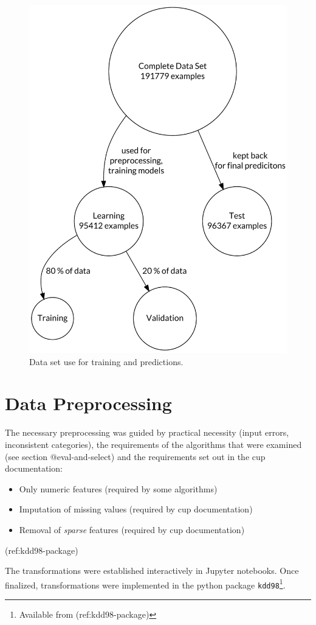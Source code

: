 \documentclass[
  11pt,
  a4paper,
  DIV=12,captions=tableheading,oneside,titlepage=firstiscover,abstracton]{scrreprt}
\providecommand{\tightlist}{%
  \setlength{\itemsep}{0pt}\setlength{\parskip}{0pt}}
\providecommand{\tightlist}{%
  \setlength{\itemsep}{0pt}\setlength{\parskip}{0pt}}
\begin{document}
\begin{figure}

{\centering \includegraphics[width=0.5\linewidth]{figures/preprocessing/data-splitting} 

}

\caption{Data set use for training and predictions.}\label{fig:data-splitting}
\end{figure}

\hypertarget{data-preprocessing}{%
\section{Data Preprocessing}\label{data-preprocessing}}

The necessary preprocessing was guided by practical necessity (input errors, inconsistent categories), the requirements of the algorithms that were examined (see section @eval-and-select) and the requirements set out in the cup documentation:

\begin{itemize}
\tightlist
\item
  Only numeric features (required by some algorithms)
\item
  Imputation of missing values (required by cup documentation)
\item
  Removal of \emph{sparse} features (required by cup documentation)
\end{itemize}

(ref:kdd98-package)

The transformations were established interactively in Jupyter notebooks. Once finalized, transformations were implemented in the python package \texttt{kdd98}\footnote{Available from (ref:kdd98-package)}.
\end{document}
